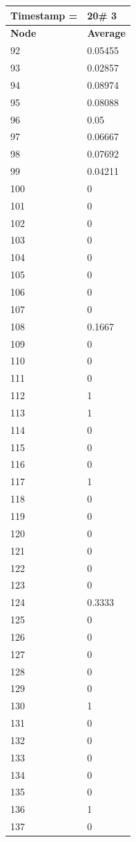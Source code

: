 \begin{tabular}{|l||l|}
\hline
\textbf{Timestamp =} & \textbf{20}\# 3\\\hline
	\textbf{Node} & \textbf{Average} \\ \hline
\hline
	92 & 0.05455 \\ \hline
	93 & 0.02857 \\ \hline
	94 & 0.08974 \\ \hline
	95 & 0.08088 \\ \hline
	96 & 0.05 \\ \hline
	97 & 0.06667 \\ \hline
	98 & 0.07692 \\ \hline
	99 & 0.04211 \\ \hline
	100 & 0 \\ \hline
	101 & 0 \\ \hline
	102 & 0 \\ \hline
	103 & 0 \\ \hline
	104 & 0 \\ \hline
	105 & 0 \\ \hline
	106 & 0 \\ \hline
	107 & 0 \\ \hline
	108 & 0.1667 \\ \hline
	109 & 0 \\ \hline
	110 & 0 \\ \hline
	111 & 0 \\ \hline
	112 & 1 \\ \hline
	113 & 1 \\ \hline
	114 & 0 \\ \hline
	115 & 0 \\ \hline
	116 & 0 \\ \hline
	117 & 1 \\ \hline
	118 & 0 \\ \hline
	119 & 0 \\ \hline
	120 & 0 \\ \hline
	121 & 0 \\ \hline
	122 & 0 \\ \hline
	123 & 0 \\ \hline
	124 & 0.3333 \\ \hline
	125 & 0 \\ \hline
	126 & 0 \\ \hline
	127 & 0 \\ \hline
	128 & 0 \\ \hline
	129 & 0 \\ \hline
	130 & 1 \\ \hline
	131 & 0 \\ \hline
	132 & 0 \\ \hline
	133 & 0 \\ \hline
	134 & 0 \\ \hline
	135 & 0 \\ \hline
	136 & 1 \\ \hline
	137 & 0 \\ \hline
\end{tabular}

